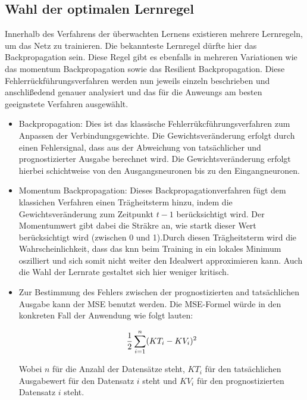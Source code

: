 \subsection{Wahl der optimalen Lernregel} %

Innerhalb des Verfahrens der überwachten Lernens existieren mehrere Lernregeln, um das Netz zu trainieren. Die bekannteste Lernregel dürfte hier das Backpropagation sein. Diese Regel gibt es ebenfalls in mehreren Variationen wie das momentum Backpropagation sowie das Resilient Backpropagation. Diese Fehlerrückführungsverfahren werden nun jeweils einzeln beschrieben und anschlißedend genauer analysiert und das für die Anweungs am besten geeignstete Verfahren ausgewählt.

\begin{itemize}
\item Backpropagation: Dies ist das klassische Fehlerrükcführungsverfahren zum Anpassen der Verbindungsgewichte. Die Gewichtsveränderung erfolgt durch einen Fehlersignal, dass aus der Abweichung von tatsächlicher und prognostizierter Ausgabe berechnet wird. Die Gewichtsveränderung erfolgt hierbei schichtweise von den Ausgangsneuronen bis zu den Eingangneuronen.

\item Momentum Backpropagation: Dieses Backpropagationverfahren fügt dem klassichen Verfahren einen Trägheitsterm hinzu, indem die Gewichtsveränderung zum Zeitpunkt $t-1$ berücksichtigt wird. Der Momentumwert gibt dabei die Sträkre an, wie startk dieser Wert berücksichtigt wird (zwischen 0 und 1).Durch diesen Trägheitsterm wird die Wahrscheinlichkeit, dass das \acs{knn} beim Training in ein lokales Minimum oszilliert und sich somit nicht weiter den Idealwert approximieren kann. Auch die Wahl der Lernrate gestaltet sich hier weniger kritisch. 

\item  




Zur Bestimmung des Fehlers zwischen der prognostizierten and tatsächlichen Ausgabe kann der MSE benutzt werden. Die MSE-Formel würde in den konkreten Fall der Anwendung wie folgt lauten:

\begin{equation}\formelentry{MSE zur Berechnung der Abweichung}
   \frac{1}{2}\sum^{n}_{i=1} (KT_{i} - KV_{i})^2
\end{equation}

Wobei $n$ für die Anzahl der Datensätze steht, $KT_i$ für den tatsächlichen Ausgabewert für den Datensatz $i$ steht und $KV_i$ für den prognostizierten Datensatz $i$ steht.

\end{itemize}



